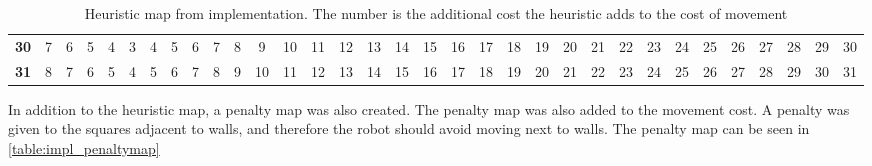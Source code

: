 \documentclass[Main]{subfiles}
\begin{document}
\begin{table}[H]
{\begin{tabular}{ccccccccccccccccccccccccccccccccc}
			\textbf{30} &  7 &  6 &  5 &  4 &  3 &  4 &  5 &  6 &  7 &  8 &  9 & 10 & 11 & 12 & 13 & 14 & 15 & 16 & 17 & 18 & 19 & 20 & 21 & 22 & 23 & 24 & 25 & 26 & 27 & 28 & 29 & 30 \\
			\textbf{31} &  8 &  7 &  6 &  5 &  4 &  5 &  6 &  7 &  8 &  9 & 10 & 11 & 12 & 13 & 14 & 15 & 16 & 17 & 18 & 19 & 20 & 21 & 22 & 23 & 24 & 25 & 26 & 27 & 28 & 29 & 30 & 31 \\
			\end{tabular}
		}
		\caption{Heuristic map from implementation. The number is the additional cost the heuristic adds to the cost of movement}
		\label{table:impl_heuristicmap} 
	\end{table} \noindent
	
	In addition to the heuristic map, a penalty map was also created.
	The penalty map was also added to the movement cost. 
	A penalty was given to the squares adjacent to walls, and therefore the robot should avoid moving next to walls.
	The penalty map can be seen in \autoref{table:impl_penaltymap}
		
\end{document}
